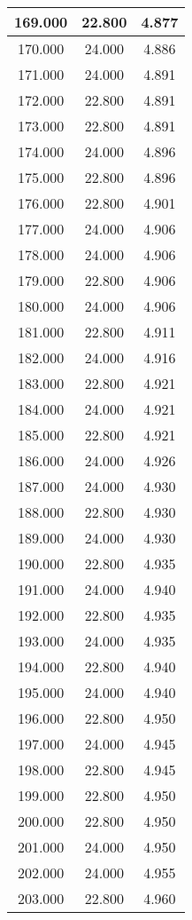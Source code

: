 \documentclass[11pt,a4paper]{jsarticle}
\begin{document}
\begin{center}
\begin{longtable}{|c|c|c|}
169.000	 & 22.800&  4.877 \\ \hline
170.000	 & 24.000&  4.886 \\ \hline
171.000	 & 24.000&  4.891 \\ \hline
172.000	 & 22.800&  4.891 \\ \hline
173.000	 & 22.800&  4.891 \\ \hline
174.000	 & 24.000&  4.896 \\ \hline
175.000	 & 22.800&  4.896 \\ \hline
176.000	 & 22.800&  4.901 \\ \hline
177.000	 & 24.000&  4.906 \\ \hline
178.000	 & 24.000&  4.906 \\ \hline
179.000	 & 22.800&  4.906 \\ \hline
180.000	 & 24.000&  4.906 \\ \hline
181.000	 & 22.800&  4.911 \\ \hline
182.000	 & 24.000&  4.916 \\ \hline
183.000	 & 22.800&  4.921 \\ \hline
184.000	 & 24.000&  4.921 \\ \hline
185.000	 & 22.800&  4.921 \\ \hline
186.000	 & 24.000&  4.926 \\ \hline
187.000	 & 24.000&  4.930 \\ \hline
188.000	 & 22.800&  4.930 \\ \hline
189.000	 & 24.000&  4.930 \\ \hline
190.000	 & 22.800&  4.935 \\ \hline
191.000	 & 24.000&  4.940 \\ \hline
192.000	 & 22.800&  4.935 \\ \hline
193.000	 & 24.000&  4.935 \\ \hline
194.000	 & 22.800&  4.940 \\ \hline
195.000	 & 24.000&  4.940 \\ \hline
196.000	 & 22.800&  4.950 \\ \hline
197.000	 & 24.000&  4.945 \\ \hline
198.000	 & 22.800&  4.945 \\ \hline
199.000	 & 22.800&  4.950 \\ \hline
200.000	 & 22.800&  4.950 \\ \hline
201.000	 & 24.000&  4.950 \\ \hline
202.000	 & 24.000&  4.955 \\ \hline
203.000	 & 22.800&  4.960 \\ \hline

\end{longtable}
\end{center}
\end{document}

